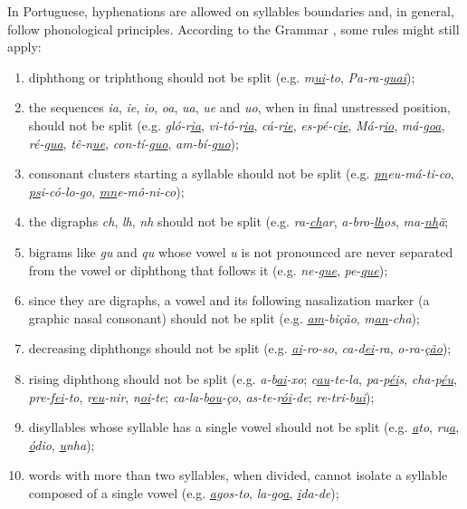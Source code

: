 \documentclass{article}
\begin{document}
In Portuguese, hyphenations are allowed on syllables boundaries and, in
general, follow phonological principles.  According to the Grammar
\parencite{cunha2016,bergstrom2011,cegalla2008}, some rules might still apply:
\begin{enumerate}
    \item\label{rule-di-triphthong} diphthong or triphthong should not be split
	(e.g. \emph{m\underline{ui}-to}, \emph{Pa-ra-g\underline{uai}});
    \item\label{rule-unstressed} the sequences \emph{ia}, \emph{ie}, \emph{io}, \emph{oa}, \emph{ua},
	\emph{ue} and \emph{uo}, when in final unstressed position, should not be split 
	(e.g. \emph{gló-r\underline{ia}}, \emph{vi-tó-r\underline{ia}}, 
	\emph{cá-r\underline{ie}}, \emph{es-pé-c\underline{ie}}, 
	\emph{Má-r\underline{io}}, \emph{má-g\underline{oa}}, 
	\emph{ré-g\underline{ua}}, \emph{tê-n\underline{ue}}, 
	\emph{con-tí-g\underline{uo}}, \emph{am-bí-g\underline{uo}});
    \item\label{rule-c-clusters} consonant clusters starting a syllable should not be
	split (e.g. \emph{\underline{pn}eu-má-ti-co}, \emph{\underline{ps}i-có-lo-go}, 
	\emph{\underline{mn}e-mô-ni-co});
    \item\label{rules-digraphs-ns} the digraphs	\emph{ch}, \emph{lh}, \emph{nh}
	should not be split (e.g. \emph{ra-\underline{ch}ar},
	\emph{a-bro-\underline{lh}os}, \emph{ma-\underline{nh}ã};
    \item\label{rule-guqu} bigrams like \emph{gu} and \emph{qu} whose vowel \emph{u} is not 
	pronounced are never separated from the vowel or diphthong that follows it 
	(e.g. \emph{ne-\underline{gue}}, \emph{pe-\underline{que}});
    \item\label{rule-nasalization} since they are digraphs, a vowel and its following 
	nasalization marker (a graphic nasal consonant) should not be split (e.g. \emph{\underline{am}-bição},
	\emph{m\underline{an}-cha});
    \item\label{rule-decreasing} decreasing diphthongs should not be split (e.g. 
	\emph{\underline{ai}-ro-so}, \emph{ca-d\underline{ei}-ra}, 
	\emph{o-ra-ç\underline{ão}});
    \item\label{rule-rising} rising diphthong should not be split (e.g.
	\emph{a-b\underline{ai}-xo}; \emph{c\underline{au}-te-la}, 
	\emph{pa-p\underline{éi}s}, \emph{cha-p\underline{éu}}, 
	\emph{pre-f\underline{ei}-to}, \emph{r\underline{eu}-nir},
	\emph{n\underline{oi}-te}; \emph{ca-la-b\underline{ou}-ço}, 
	\emph{as-te-r\underline{ói}-de}; 
	\emph{re-tri-b\underline{ui}});
    \item\label{rule-singlev} disyllables whose syllable has a single vowel should 
	not be split (e.g. \emph{\underline{a}to}, \emph{ru\underline{a}}, 
	\emph{\underline{ó}dio}, \emph{\underline{u}nha});
    \item\label{rule-orphan} words with more than two syllables, when divided, cannot 
	isolate a syllable composed of a single vowel (e.g. \emph{\underline{a}gos-to}, 
	\emph{la-go\underline{a}}, \emph{\underline{i}da-de});



\end{enumerate}
\end{document}

